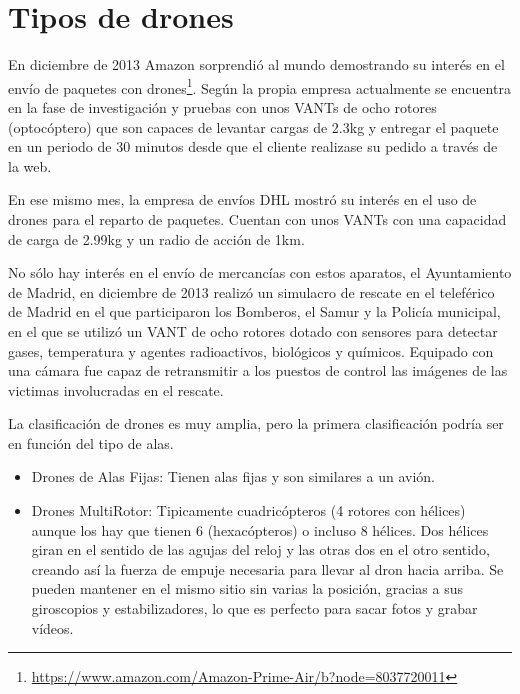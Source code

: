 \section{Tipos de drones}
\label{sec:tiposdrones}

En diciembre de 2013 Amazon sorprendió al mundo demostrando su interés en el envío de paquetes con drones\footnote{\url{https://www.amazon.com/Amazon-Prime-Air/b?node=8037720011}}. Según la propia empresa actualmente se encuentra en la fase de investigación y pruebas con unos VANTs de ocho rotores (optocóptero) que son capaces de levantar cargas de 2.3kg y entregar el paquete en un periodo de 30 minutos desde que el cliente realizase su pedido a través de la web. 

En ese mismo mes, la empresa de envíos DHL mostró su interés en el uso de drones para el reparto de paquetes. Cuentan con unos VANTs con una capacidad de carga de 2.99kg y un radio de acción de 1km. 

No sólo hay interés en el envío de mercancías con estos aparatos, el Ayuntamiento de Madrid, en diciembre de 2013 realizó un simulacro de rescate en el teleférico de Madrid en el que participaron los Bomberos, el Samur y la Policía municipal, en el que se utilizó un VANT de ocho rotores dotado con sensores para detectar gases, temperatura y agentes radioactivos, biológicos y químicos. Equipado con una cámara fue capaz de retransmitir a los puestos de control las imágenes de las victimas involucradas en el rescate.

La clasificación de drones es muy amplia, pero la primera clasificación podría ser en función del tipo de alas.

\begin{itemize}
\item Drones de Alas Fijas: Tienen alas fijas y son similares a un avión.
\item Drones MultiRotor: Tipicamente cuadricópteros (4 rotores con hélices) aunque los hay que tienen 6 (hexacópteros) o incluso 8 hélices. Dos hélices giran en el sentido de las agujas del reloj y las otras dos en el otro sentido, creando así la fuerza de empuje necesaria para llevar al dron hacia arriba. Se pueden mantener en el mismo sitio sin varias la posición, gracias a sus giroscopios y estabilizadores, lo que es perfecto para sacar fotos y grabar vídeos.
\end{itemize}

